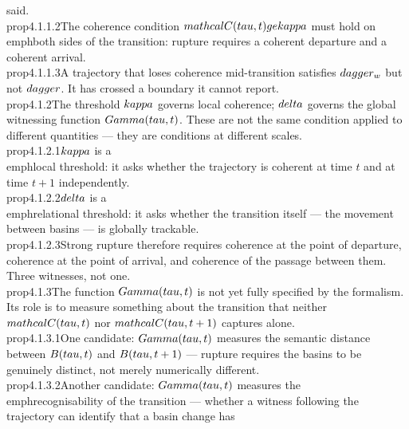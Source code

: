 {said.}\n\n\\prop{4.1.1.2}{The coherence condition $\\mathcal{C}(\\tau,t)\\ge \\kappa$ must hold on \\emph{both} sides of the transition: rupture requires a coherent departure and a coherent arrival.}\n\n\\prop{4.1.1.3}{A trajectory that loses coherence mid-transition satisfies $\\dagger_w$ but not $\\dagger$. It has crossed a boundary it cannot report.}\n\n\\prop{4.1.2}{The threshold $\\kappa$ governs local coherence; $\\delta$ governs the global witnessing function $\\Gamma(\\tau,t)$. These are not the same condition applied to different quantities — they are conditions at different scales.}\n\n\\prop{4.1.2.1}{$\\kappa$ is a \\emph{local} threshold: it asks whether the trajectory is coherent at time $t$ and at time $t+1$ independently.}\n\n\\prop{4.1.2.2}{$\\delta$ is a \\emph{relational} threshold: it asks whether the transition itself — the movement between basins — is globally trackable.}\n\n\\prop{4.1.2.3}{Strong rupture therefore requires coherence at the point of departure, coherence at the point of arrival, and coherence of the passage between them. Three witnesses, not one.}\n\n\\prop{4.1.3}{The function $\\Gamma(\\tau,t)$ is not yet fully specified by the formalism. Its role is to measure something about the transition that neither $\\mathcal{C}(\\tau,t)$ nor $\\mathcal{C}(\\tau,t+1)$ captures alone.}\n\n\\prop{4.1.3.1}{One candidate: $\\Gamma(\\tau,t)$ measures the semantic distance between $B(\\tau,t)$ and $B(\\tau,t+1)$ — rupture requires the basins to be genuinely distinct, not merely numerically different.}\n\n\\prop{4.1.3.2}{Another candidate: $\\Gamma(\\tau,t)$ measures the \\emph{recognisability} of the transition — whether a witness following the trajectory can identify that a basin change has }
